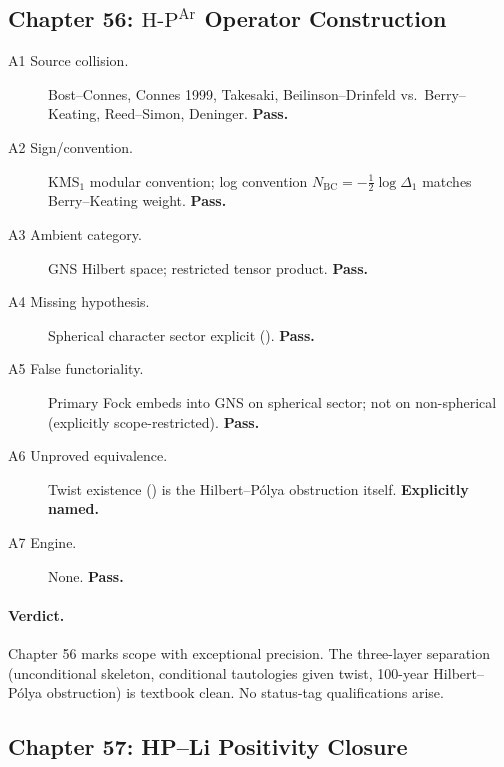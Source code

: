 \subsection{Chapter 56: \(\mathrm{H\text{-}P}^{\mathrm{Ar}}\) Operator Construction}
\label{v4-arith:w6-j:ch56}

\begin{description}
\item[A1 Source collision.] Bost--Connes, Connes 1999, Takesaki,
Beilinson--Drinfeld vs.\ Berry--Keating, Reed--Simon, Deninger.
\textbf{Pass.}
\item[A2 Sign/convention.] KMS\({}_{1}\) modular convention; log
convention \(N_{\mathrm{BC}}=-\tfrac12\log\Delta_{1}\) matches
Berry--Keating weight. \textbf{Pass.}
\item[A3 Ambient category.] GNS Hilbert space; restricted tensor
product. \textbf{Pass.}
\item[A4 Missing hypothesis.] Spherical character sector explicit
(). \textbf{Pass.}
\item[A5 False functoriality.] Primary Fock embeds into GNS on
spherical sector; not on non-spherical (explicitly scope-restricted).
\textbf{Pass.}
\item[A6 Unproved equivalence.] Twist existence
() is the
Hilbert--P\'olya obstruction itself. \textbf{Explicitly named.}
\item[A7 Engine.] None. \textbf{Pass.}
\end{description}

\paragraph{Verdict.} Chapter 56 marks scope with exceptional
precision. The three-layer separation (unconditional skeleton,
conditional tautologies given twist, 100-year Hilbert--P\'olya
obstruction) is textbook clean. No status-tag qualifications arise.

\subsection{Chapter 57: HP--Li Positivity Closure}
\label{v4-arith:w6-j:ch57}

